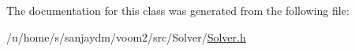 The documentation for this class was generated from the following file:\begin{DoxyCompactItemize}
\item 
/u/home/s/sanjaydm/voom2/src/Solver/\hyperlink{_solver_8h}{Solver.h}\end{DoxyCompactItemize}
